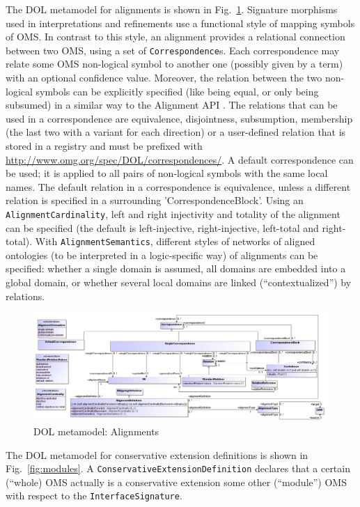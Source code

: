 \documentclass[10pt, a4paper]{isov2}
\newcommand*{\termref}[1]{\index{#1}#1\xspace}
\newcommand*{\syntax}[1]{\texttt{#1}}
\begin{document}
The DOL metamodel for alignments is shown in 
Fig.~\ref{fig:alignment}.
Signature morphisms used in interpretations and refinements use
a functional style of mapping symbols of OMS.
In contrast to this style, an alignment provides a relational 
connection between two OMS,  using a set of \syntax{Correspondence}s. Each correspondence may relate 
some OMS non-logical symbol to another one (possibly given by a term) with an optional confidence 
value. Moreover, the relation between the two non-logical symbols can be explicitly
specified (like being equal, or only being subsumed) in a similar way to the Alignment API \cite{AlignmentAPI}. 
The relations that can be used in a correspondence are equivalence, disjointness, subsumption, membership (the last two with a
variant for each direction) or a user-defined relation that is stored in a registry and must be prefixed with
\url{http://www.omg.org/spec/DOL/correspondences/}.
A default correspondence can be used; it is applied to all pairs of non-logical symbols with 
the same local names. The default relation in a correspondence is equivalence, unless  a different 
relation is specified in a surrounding 
'CorrespondenceBlock'.
Using an \syntax{AlignmentCardinality}, left and right injectivity and totality of the
\termref{alignment} can be specified (the default is left-injective, right-injective, left-total  and right-total).
With \syntax{AlignmentSemantics}, different styles of networks of aligned ontologies (to be interpreted in 
a logic-specific way) of alignments can be specified: whether a single domain is assumed, all domains are embedded into a global domain,
or whether several local domains are linked (``contextualized'') by relations.

\begin{figure}
  \centering
    \includegraphics[scale=0.43]{mof/alignment.png}
  \caption{DOL metamodel: Alignments}
  \label{fig:alignment}
\end{figure}


The DOL metamodel for conservative extension definitions is shown in 
Fig.~\ref{fig:modules}.
A \syntax{ConservativeExtensionDefinition} declares that a certain (``whole) OMS
actually is a conservative extension some other (``module'') OMS with respect
to the \syntax{InterfaceSignature}.
\end{document}
